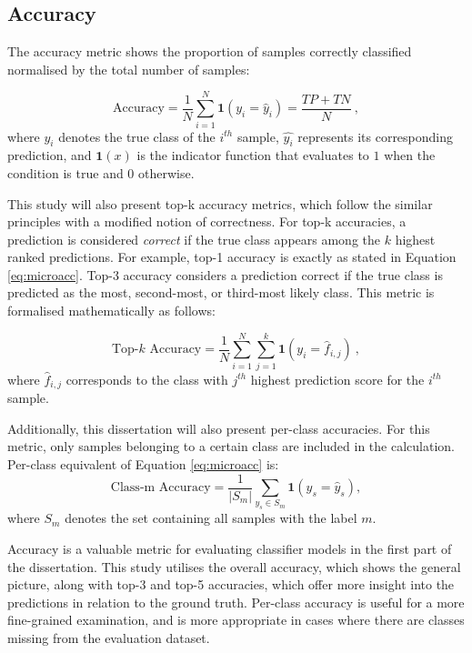 \documentclass{l4proj}
\begin{document}
\subsection{Accuracy} \label{sec:accuracy-metric}
The accuracy metric shows the proportion of samples correctly classified normalised by the total number of samples:

\begin{equation} \label{eq:microacc}
    \text{Accuracy} = \frac{1}{N} \sum_{i=1}^{N}\mathbf{1}(y_i = \hat{y}_i) =  \frac{TP+TN}{N}\ ,
\end{equation}
where $y_i$ denotes the true class of the $i^{th}$ sample, $\hat{y_i}$ represents its corresponding prediction, and $\mathbf{1}(x)$ is the indicator function that evaluates to $1$ when the condition is true and $0$ otherwise.

This study will also present top-k accuracy metrics, which follow the similar principles with a modified notion of correctness. For top-k accuracies, a prediction is considered \emph{correct} if the true class appears among the $k$ highest ranked predictions. For example, top-1 accuracy is exactly as stated in Equation \ref{eq:microacc}. Top-3 accuracy considers a prediction correct if the true class is predicted as the most, second-most, or third-most likely class. This metric is formalised mathematically as follows:

\begin{equation}
    \text{Top-$k$ Accuracy} = \frac{1}{N} \sum_{i=1}^{N} \sum_{j=1}^k \mathbf{1}(y_i = \hat{f}_{i,j})\ ,
\end{equation}
where $\hat{f}_{i,j}$ corresponds to the class with $j^{th}$ highest prediction score for the $i^{th}$ sample.

Additionally, this dissertation will also present per-class accuracies. For this metric, only samples belonging to a certain class are included in the calculation. Per-class equivalent of Equation \ref{eq:microacc} is:
\begin{equation} \label{eq:macroacc}
    \text{Class-m Accuracy} = \frac{1}{|S_m|} \sum_{y_s \in S_m}\mathbf{1}(y_s = \hat{y}_s),
\end{equation}
where $S_m$ denotes the set containing all samples with the label $m$.

Accuracy is a valuable metric for evaluating classifier models in the first part of the dissertation. This study utilises the overall accuracy, which shows the general picture, along with top-3 and top-5 accuracies, which offer more insight into the predictions in relation to the ground truth. Per-class accuracy is useful for a more fine-grained examination, and is more appropriate in cases where there are classes missing from the evaluation dataset.
\end{document}
